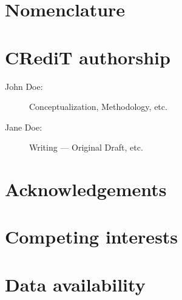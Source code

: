 

\section{Nomenclature}
\label{app:nomenclature}


\section{CRediT authorship}
\label{app:credit}

\begin{description}
    \item[John Doe:] Conceptualization, Methodology, etc.
    \item[Jane Doe:] Writing --- Original Draft, etc.
\end{description}


\section{Acknowledgements}
\label{app:acknowledgements}


\section{Competing interests}
\label{app:interests}


\section{Data availability}
\label{app:data}
